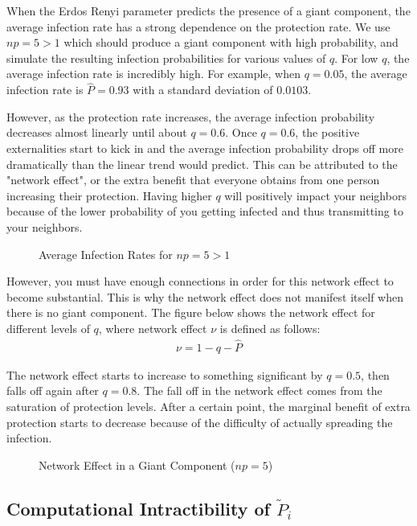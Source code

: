\documentclass{article}
\theoremstyle{plain}
\begin{document}
When the Erdos Renyi parameter predicts the presence of a giant component, the average infection rate has a strong dependence on the protection rate. We use $np = 5 > 1$ which should produce a giant component with high probability, and simulate the resulting infection probabilities for various values of $q$. For low $q$, the average infection rate is incredibly high. For example, when $q = 0.05$, the average infection rate is $\hat{P} = 0.93$ with a standard deviation of $0.0103$.

However, as the protection rate increases, the average infection probability decreases almost linearly until about $q = 0.6$. Once $q = 0.6$, the positive externalities start to kick in and the average infection probability drops off more dramatically than the linear trend would predict. This can be attributed to the "network effect", or the extra benefit that everyone obtains from one person increasing their protection. Having higher $q$ will positively impact your neighbors because of the lower probability of you getting infected and thus transmitting to your neighbors. 

\begin{figure}
  \caption{Average Infection Rates for $np = 5 > 1$}
\end{figure}

However, you must have enough connections in order for this network effect to become substantial. This is why the network effect does not manifest itself when there is no giant component. The figure below shows the network effect for different levels of $q$, where network effect $\nu$ is defined as follows:
\begin{eqnarray}
 \nu = 1 - q - \hat{P}
\end{eqnarray}

The network effect starts to increase to something significant by $q = 0.5$, then falls off again after $q = 0.8$. The fall off in the network effect comes from the saturation of protection levels. After a certain point, the marginal benefit of extra protection starts to decrease because of the difficulty of actually spreading the infection.

\begin{figure}
  \caption{Network Effect in a Giant Component ($np = 5$)}
\end{figure}

\subsection{Computational Intractibility of $\tilde{P}_i$}
\end{document}

